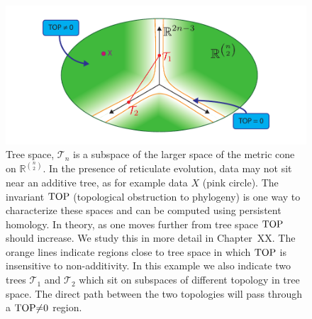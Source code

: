 \begin{figure}
\centering
\includegraphics[]{./fig/background/tree_space_revisited_v2.pdf}
\caption[Tree Space Revisited]{Tree space, $\mathcal{T}_{n}$ is a subspace of the larger space of the metric cone on $\mathbb{R}^{\binom{n}{2}}$. In the presence of reticulate evolution, data may not sit near an additive tree, as for example data $X$ (pink circle). The invariant $\operatorname{TOP}$ (topological obstruction to phylogeny) is one way to characterize these spaces and can be computed using persistent homology. In theory, as one moves further from tree space $\operatorname{TOP}$ should increase. We study this in more detail in Chapter~XX. The orange lines indicate regions close to tree space in which $\operatorname{TOP}$ is insensitive to non-additivity. In this example we also indicate two trees $\mathcal{T}_{1}$ and $\mathcal{T}_{2}$ which sit on subspaces of different topology in tree space. The direct path between the two topologies will pass through a ${\operatorname{TOP}}{\neq}{0}$ region.}
\label{fig:bg:tree_space_revisited}
\end{figure}